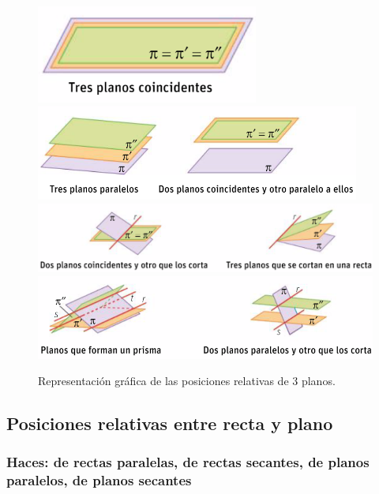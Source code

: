 \begin{figure}[hptb]
    \centering
    \includegraphics[width=0.65\textwidth]{img/Captura1.png}
    \includegraphics[width=0.95\textwidth]{img/Captura2.png}
    \includegraphics[width=1.1\textwidth]{img/Captura3.png}
    \includegraphics[width=1.1\textwidth]{img/Captura4.png}
    \caption{Representación gráfica de las posiciones relativas de 3 planos.}
    \label{fig:PosicionesRelativasPlanos}
\end{figure}


\subsection{Posiciones relativas entre recta y plano}



\subsubsection{Haces: de rectas paralelas, de rectas secantes, de planos paralelos, de planos secantes}


